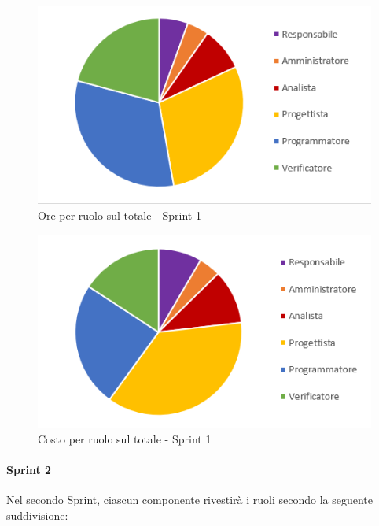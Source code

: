\begin{figure}[H]
  \centering
  \includegraphics[scale=0.8]{immagini/1Sprint_oreRuolo.png}
  \caption{Ore per ruolo sul totale - Sprint 1}
\end{figure}

\begin{figure}[H]
  \centering
  \includegraphics[scale=0.8]{immagini/1Sprint_costoRuolo.png}
  \caption{Costo per ruolo sul totale - Sprint 1}
\end{figure}
\pagebreak


\paragraph{Sprint 2} \label{paragraph:preventivo_sprint2}
Nel secondo Sprint\glo{}, ciascun componente rivestirà i ruoli secondo la seguente suddivisione:

